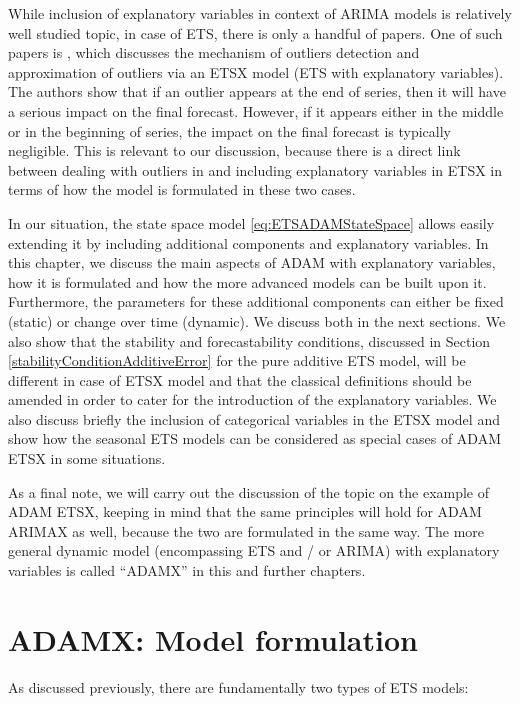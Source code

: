 \documentclass[
]{book}
\theoremstyle{definition}
\theoremstyle{definition}
\theoremstyle{definition}
\theoremstyle{definition}
\theoremstyle{remark}
\begin{document}
While inclusion of explanatory variables in context of ARIMA models is relatively well studied topic, in case of ETS, there is only a handful of papers. One of such papers is \citet{Koehler2012}, which discusses the mechanism of outliers detection and approximation of outliers via an ETSX model (ETS with explanatory variables). The authors show that if an outlier appears at the end of series, then it will have a serious impact on the final forecast. However, if it appears either in the middle or in the beginning of series, the impact on the final forecast is typically negligible. This is relevant to our discussion, because there is a direct link between dealing with outliers in \citet{Koehler2012} and including explanatory variables in ETSX in terms of how the model is formulated in these two cases.

In our situation, the state space model \eqref{eq:ETSADAMStateSpace} allows easily extending it by including additional components and explanatory variables. In this chapter, we discuss the main aspects of ADAM with explanatory variables, how it is formulated and how the more advanced models can be built upon it. Furthermore, the parameters for these additional components can either be fixed (static) or change over time (dynamic). We discuss both in the next sections. We also show that the stability and forecastability conditions, discussed in Section \ref{stabilityConditionAdditiveError} for the pure additive ETS model, will be different in case of ETSX model and that the classical definitions should be amended in order to cater for the introduction of the explanatory variables. We also discuss briefly the inclusion of categorical variables in the ETSX model and show how the seasonal ETS models can be considered as special cases of ADAM ETSX in some situations.

As a final note, we will carry out the discussion of the topic on the example of ADAM ETSX, keeping in mind that the same principles will hold for ADAM ARIMAX as well, because the two are formulated in the same way. The more general dynamic model (encompassing ETS and / or ARIMA) with explanatory variables is called ``ADAMX'' in this and further chapters.

\hypertarget{adamx-model-formulation}{%
\section{ADAMX: Model formulation}\label{adamx-model-formulation}}

As discussed previously, there are fundamentally two types of ETS models:
\end{document}
